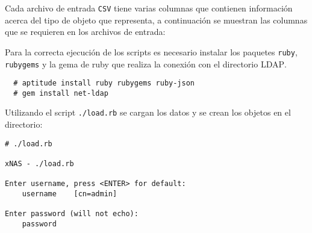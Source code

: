 Cada archivo de entrada \texttt{CSV} tiene varias columnas que contienen informaci\'{o}n acerca del tipo de objeto que representa, a continuaci\'{o}n se muestran las columnas que se requieren en los archivos de entrada:

{
 \begin{table}[H]
 \caption{Formato de los archivos \textsl{CSV}}{}
 \label{tab:csv-format}
 \noindent{} %
 \end{table}
}

Para la correcta ejecuci\'{o}n de los scripts es necesario instalar los paquetes \texttt{ruby}, \texttt{rubygems} y la gema de ruby que realiza la conexi\'{o}n con el directorio \textsc{LDAP}.

{
\scriptsize
\linespread{1}
\begin{verbatim}
  # aptitude install ruby rubygems ruby-json
  # gem install net-ldap
\end{verbatim}
}

Utilizando el script \texttt{./load.rb} se cargan los datos y se crean los objetos en el directorio:

{
\scriptsize
\linespread{1}
\begin{verbatim}
# ./load.rb

xNAS - ./load.rb

Enter username, press <ENTER> for default:
    username    [cn=admin]

Enter password (will not echo):
    password
\end{verbatim}
}


{
 \begin{table}[H]
 \caption{Script de carga de objetos en el directorio}{}
 \label{tab:load-rb}
 \noindent{} %
 \end{table}
}

